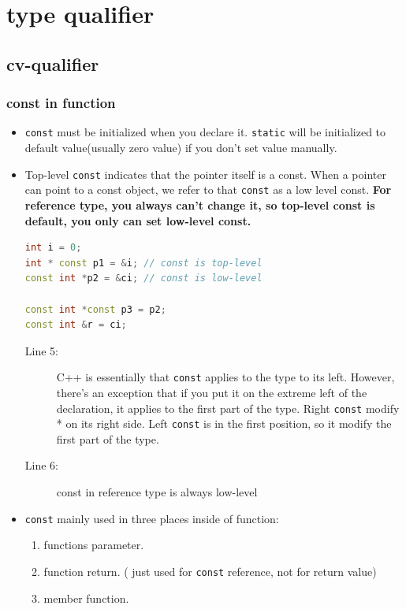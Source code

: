 \documentclass[a4paper,11pt,twoside]{book}
\begin{document}
\section{type qualifier}
\subsection{cv-qualifier}
\subsubsection{const in function}
\begin{itemize}
	
	\item \texttt{const} must be initialized when you declare it. \texttt{static} will be initialized to default value(usually zero value) if you don't set value manually. 
	
	\item Top-level \texttt{const} indicates that the pointer itself is a const. When a pointer can point to a const object, we refer to that \texttt{const} as a low level const.  \textbf{For reference type, you always can't change it, so top-level const is default, you only can set low-level const.}
\begin{lstlisting}[frame=single, language=c++]
int i = 0;
int * const p1 = &i; // const is top-level
const int *p2 = &ci; // const is low-level

const int *const p3 = p2;
const int &r = ci;
\end{lstlisting}
	\begin{description}
		\item[Line 5:] C++ is essentially that \texttt{const} applies to the type to its left. However, there's an exception that if you put it on the extreme left of the declaration, it applies to the first part of the type. Right \texttt{const} modify * on its right side. Left \texttt{const} is in the first position, so it modify the first part of the type. 

		\item[Line 6:] const in reference type is always low-level
	\end{description}
	
	\item \texttt{const} mainly used in three places inside of function:
	\begin{enumerate}
		\item functions parameter.
		\item function return. ( just used for \texttt{const} reference, not for return value)
		\item member function.
	\end{enumerate}
	

\end{itemize}
\end{document}

